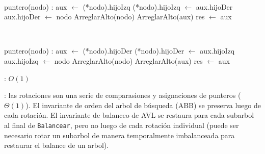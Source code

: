 \begin{Algoritmos}
	~

	\begin{algorithm}[H]
		\NoCaptionOfAlgo
		\caption{}
		\BlankLine
		puntero(nodo) : aux $\leftarrow$ (*nodo).hijoIzq
		(*nodo).hijoIzq $\leftarrow$ aux.hijoDer
		aux.hijoDer $\leftarrow$ nodo
		ArreglarAlto(nodo)
		ArreglarAlto(aux)
		res $\leftarrow$ aux
	\end{algorithm}

	~

	\begin{algorithm}[H]
		\NoCaptionOfAlgo
		\caption{}
		\BlankLine
		puntero(nodo) : aux $\leftarrow$ (*nodo).hijoDer
		(*nodo).hijoDer $\leftarrow$ aux.hijoIzq
		aux.hijoIzq $\leftarrow$ nodo
		ArreglarAlto(nodo)
		ArreglarAlto(aux)
		res $\leftarrow$ aux
	\end{algorithm}
	
	\complejidad: $O(1)$

	\justifcomp: las rotaciones son una serie de comparasiones y asignaciones de punteros ($\Theta(1)$). El invariante de orden del arbol de búsqueda (ABB) se preserva luego de cada rotación. El invariante de balanceo de AVL se restaura para cada subarbol al final de \texttt{Balancear}, pero no luego de cada rotación individual (puede ser necesario rotar un subarbol de manera temporalmente imbalanceada para restaurar el balance de un arbol).

\end{Algoritmos}